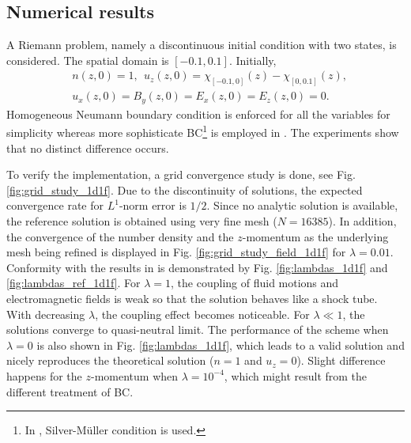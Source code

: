 \documentclass{report}
\begin{document}
\subsection{Numerical results}
A Riemann problem, namely a discontinuous initial condition with two states, is considered. The spatial domain is $[-0.1, 0.1]$. Initially, 
\begin{align*}
    & n(z,0) = 1,\ \ u_z(z,0) = \chi_{[-0.1,0]}(z) - \chi_{[0,0.1]}(z), \\
    & u_x(z,0) = B_y(z,0) = E_x(z,0) = E_z(z,0) = 0.
\end{align*}
Homogeneous Neumann boundary condition is enforced for all the variables for simplicity whereas more sophisticate BC\footnote{In \cite{degond_2012}, Silver-M\"{u}ller condition is used.} is employed in \cite{degond_2012}. The experiments show that no distinct difference occurs. 

To verify the implementation, a grid convergence study is done, see Fig. \ref{fig:grid_study_1d1f}. Due to the discontinuity of solutions, the expected convergence rate for $L^1$-norm error is $1/2$. Since no analytic solution is available, the reference solution is obtained using very fine mesh ($N = 16385$). In addition, the convergence of the number density and the $z$-momentum as the underlying mesh being refined is displayed in Fig. \ref{fig:grid_study_field_1d1f} for $\lambda = 0.01$. Conformity with the results in \cite{degond_2012} is demonstrated by Fig. \ref{fig:lambdas_1d1f} and \ref{fig:lambdas_ref_1d1f}. For $\lambda = 1$, the coupling of fluid motions and electromagnetic fields is weak so that the solution behaves like a shock tube. With decreasing $\lambda$, the coupling effect becomes noticeable. For $\lambda \ll 1$, the solutions converge to quasi-neutral limit. The performance of the scheme when $\lambda = 0$ is also shown in Fig. \ref{fig:lambdas_1d1f}, which leads to a valid solution and nicely reproduces the theoretical solution ($n = 1$ and $u_z = 0$). Slight difference happens for the $z$-momentum when $\lambda = 10^{-4}$, which might result from the different treatment of BC. 
\end{document}
